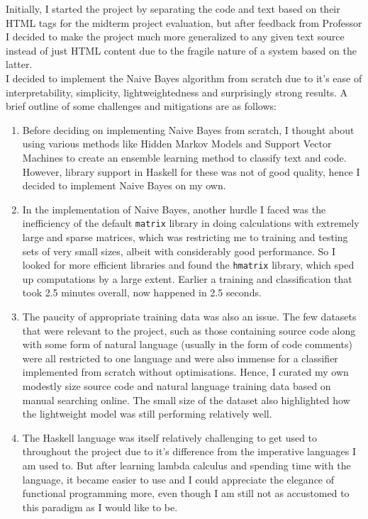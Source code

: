 \documentclass[12pt]{scrreprt}
\newcommand{\ttt}[1]{\texttt{#1}}
\begin{document}
Initially, I started the project by separating the code and text based on their HTML tags for the midterm project evaluation, but after feedback from Professor I decided to make the project much more generalized to any given text source instead of just HTML content due to the fragile nature of a system based on the latter. \\ I decided to implement the Naive Bayes algorithm from scratch due to it's ease of interpretability, simplicity, lightweightedness and surprisingly strong results. A brief outline of some challenges and mitigations are as follows:
\begin{enumerate}
    \item Before deciding on implementing Naive Bayes from scratch, I thought about using various methods like Hidden Markov Models and Support Vector Machines to create an ensemble learning method to classify text and code. However, library support in Haskell for these was not of good quality, hence I decided to implement Naive Bayes on my own.
    \item In the implementation of Naive Bayes, another hurdle I faced was the inefficiency of the default \ttt{matrix} library in doing calculations with extremely large and sparse matrices, which was restricting me to training and testing sets of very small sizes, albeit with considerably good performance. So I looked for more efficient libraries and found the \ttt{hmatrix} library, which sped up computations by a large extent. Earlier a training and classification that took 2.5 minutes overall, now happened in 2.5 seconds. 
    \item The paucity of appropriate training data was also an issue. The few datasets that were relevant to the project, such as those containing source code along with some form of natural language (usually in the form of code comments) were all restricted to one language and were also immense for a classifier implemented from scratch without optimisations. Hence, I curated my own modestly size source code and natural language training data based on manual searching online. The small size of the dataset also highlighted how the lightweight model was still performing relatively well. 
    \item The Haskell language was itself relatively challenging to get used to throughout the project due to it's difference from the imperative languages I am used to. But after learning lambda calculus and spending time with the language, it became easier to use and I could appreciate the elegance of functional programming more, even though I am still not as accustomed to this paradigm as I would like to be. 
\end{enumerate}
\end{document}
